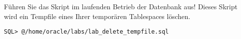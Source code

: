     \item F\"uhren Sie das Skript  im laufenden Betrieb der Datenbank aus! Dieses Skript wird ein Tempfile eines Ihrer tempor\"aren Tablespaces l\"oschen.
    \begin{lstlisting}[language=terminal]
SQL> @/home/oracle/labs/lab_delete_tempfile.sql
    \end{lstlisting}
